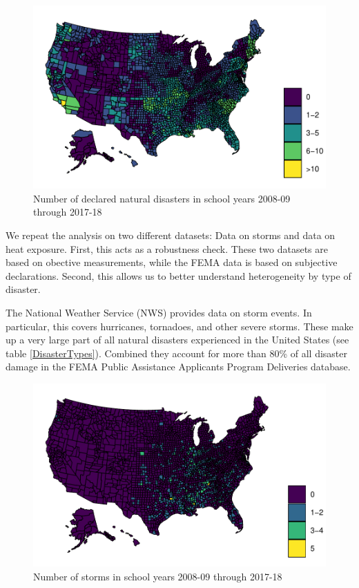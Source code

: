 \begin{figure}[!h]
	\centering
	\includegraphics[scale=1]{"../Code & Data/DisasterMap.pdf"}
	\caption{Number of declared natural disasters in school years 2008-09 through 2017-18}
	\label{DisasterMap}
\end{figure}



We repeat the analysis on two different datasets: Data on storms and data on heat exposure. First, this acts as a robustness check. These two datasets are based on obective measurements, while the FEMA data is based on subjective declarations. Second, this allows us to better understand heterogeneity by type of disaster.

The National Weather Service (NWS) provides data on storm events. In particular, this covers hurricanes, tornadoes, and other severe storms. These make up a very large part of all natural disasters experienced in the United States (see table \ref{DisasterTypes}). Combined they account for more than 80\% of all disaster damage in the FEMA Public Assistance Applicants Program Deliveries database.

\begin{figure}[!h]
	\centering
	\includegraphics[scale=1]{"../Code & Data/StormMap.pdf"}
	\caption{Number of storms in school years 2008-09 through 2017-18}
	\label{StormMap}
\end{figure}

